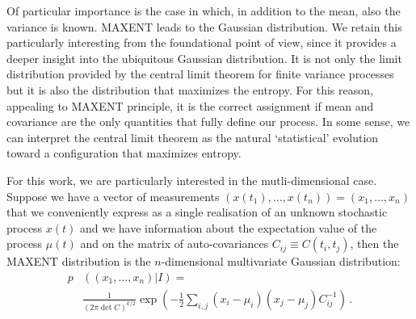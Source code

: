\documentclass[twocolumn,showpacs,preprintnumbers,nofootinbib,prd,
superscriptaddress,10pt]{revtex4-1}
\begin{document}
Of particular importance is the case in which, in addition to the mean, also the variance is known. MAXENT leads to the Gaussian distribution. 
We retain this particularly interesting from the foundational point of view, since it provides a deeper insight into the ubiquitous Gaussian distribution.
It is not only the limit distribution provided by the central limit theorem for finite variance processes but it is also the distribution that maximizes the entropy. For this reason, appealing to MAXENT principle, it is the correct assignment if mean and covariance are the only quantities that fully define our process. In some sense, we can interpret the central limit theorem as the natural `statistical' evolution toward a configuration that maximizes entropy.

For this work, we are particularly interested in the mutli-dimensional case. Suppose we have a vector of measurements $(x(t_1),\ldots,x(t_n)) = (x_1, \ldots, x_n)$ that we conveniently express as a single realisation of an unknown stochastic process $x(t)$ and we have information about the expectation value of the process $\mu(t)$ and on the matrix of auto-covariances $C_{ij} \equiv C(t_i,t_j)$, then the MAXENT distribution is the $n$-dimensional multivariate Gaussian distribution\cite{gregory_2005}: 
\begin{align}
    p&\left((x_1, \ldots, x_n)\vert I\right) = \nonumber \\
    &\frac{1}{\left(2 \pi \det C\right)^{k / 2}}\exp\left(-\frac{1}{2}\sum_{i,j}(x_i-\mu_i) (x_j-\mu_j)C^{-1}_{ij} \right)\,. 
\end{align}
\end{document}
